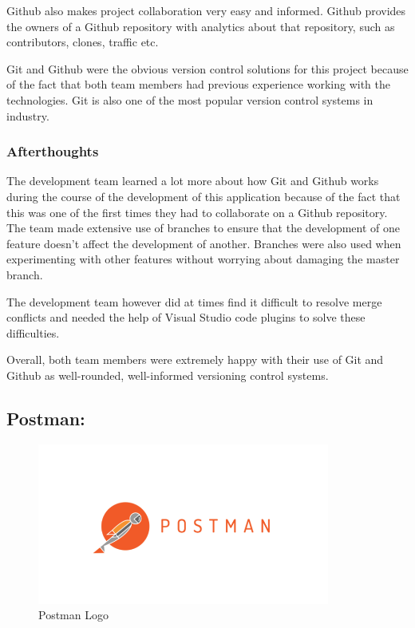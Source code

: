 Github also makes project collaboration very easy and informed. Github provides the owners of a Github repository with analytics about that repository, such as contributors, clones, traffic etc. 

\bigskip

Git and Github were the obvious version control solutions for this project because of the fact that both team members had previous experience working with the technologies. Git is also one of the most popular version control systems in industry. 

\subsubsection{Afterthoughts}

The development team learned a lot more about how Git and Github works during the course of the development of this application because of the fact that this was one of the first times they had to collaborate on a Github repository. The team made extensive use of branches to ensure that the development of one feature doesn't affect the development of another. Branches were also used when experimenting with other features without worrying about damaging the master branch. 

The development team however did at times find it difficult to resolve merge conflicts and needed the help of Visual Studio code plugins to solve these difficulties.

\bigskip
Overall, both team members were extremely happy with their use of Git and Github as well-rounded, well-informed versioning control systems. 



\subsection{Postman:}
\label{sec:TechnologyReviewPostman}

\begin{figure}[H]
    \centering
    \includegraphics[width=\textwidth, height=150pt]{img/PostManLogo.PNG}
    \caption{Postman Logo}
    \label{fig:my_label}
\end{figure}

